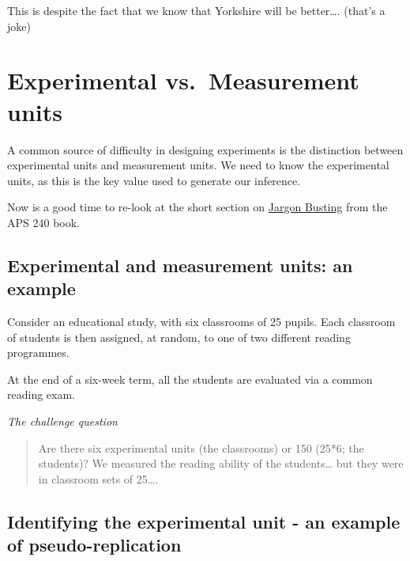 \documentclass[
]{book}
\begin{document}
This is despite the fact that we know that Yorkshire will be better\ldots. (that's a joke)

\hypertarget{experimental-vs.-measurement-units}{%
\section{Experimental vs.~Measurement units}\label{experimental-vs.-measurement-units}}

A common source of difficulty in designing experiments is the distinction between experimental units and measurement units. We need to know the experimental units, as this is the key value used to generate our inference.

Now is a good time to re-look at the short section on \href{https://dzchilds.github.io/stats-for-bio/principles-experimental-design.html\#jargon-busting}{Jargon Busting} from the APS 240 book.

\hypertarget{experimental-and-measurement-units-an-example}{%
\subsection{Experimental and measurement units: an example}\label{experimental-and-measurement-units-an-example}}

Consider an educational study, with six classrooms of 25 pupils. Each classroom of students is then assigned, at random, to one of two different reading programmes.

At the end of a six-week term, all the students are evaluated via a common reading exam.

\emph{The challenge question}

\begin{quote}
Are there six experimental units (the classrooms) or 150 (25*6; the students)? We measured the reading ability of the students\ldots{} but they were in classroom sets of 25\ldots.
\end{quote}

\hypertarget{identifying-the-experimental-unit---an-example-of-pseudo-replication}{%
\subsection{\texorpdfstring{Identifying the experimental unit - an example of \textbf{pseudo-replication}}{Identifying the experimental unit - an example of pseudo-replication}}\label{identifying-the-experimental-unit---an-example-of-pseudo-replication}}
\end{document}
